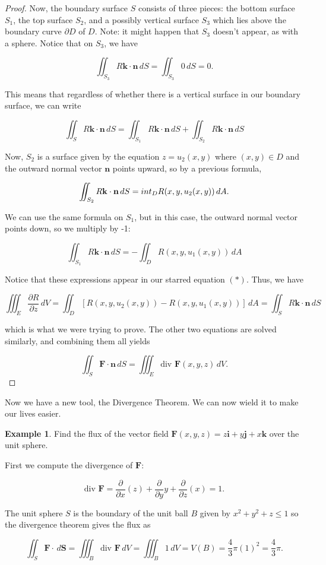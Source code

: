 \documentclass[11pt,oneside,english]{amsart}
\theoremstyle{definition}
\newtheorem*{example}{Example}
\newcommand{\pp}[2]{\frac{\partial{#1}}{\partial{#2}}}
\begin{document}
\begin{proof}
Now, the boundary surface $S$ consists of three pieces: the bottom surface $S_1$, the top surface $S_2$, and a possibly vertical surface $S_3$ which lies above the boundary curve $\partial D$ of $D$. Note: it might happen that $S_3$ doesn't appear, as with a sphere. Notice that on $S_3$, we have

\[
\iint_{S_3}R\mathbf{k}\cdot\mathbf{n}\,dS=\iint_{S_3}0\,dS=0.
\]

This means that regardless of whether there is a vertical surface in our boundary surface, we can write

\[
\iint_SR\mathbf{k}\cdot\mathbf{n}\,dS=\iint_{S_1}R\mathbf{k}\cdot\mathbf{n}\,dS+\iint_{S_2}R\mathbf{k}\cdot\mathbf{n}\,dS
\]

Now, $S_2$ is a surface given by the equation $z=u_2(x,y)$ where $(x,y)\in D$ and the outward normal vector $\mathbf{n}$ points upward, so by a previous formula,



\[
\iint_{S_2}R\mathbf{k}\cdot\mathbf{n}\,dS=\\int_DR(x,y,u_2(x,y))\,dA.
\]

We can use the same formula on $S_1$, but in this case, the outward normal vector points down, so we multiply by -1:

\[
\iint_{S_1}R\mathbf{k}\cdot\mathbf{n}\,dS=-\iint_DR(x,y,u_1(x,y))\,dA
\]

Notice that these expressions appear in our starred equation $(*)$. Thus, we have

\[
\iiint_E\pp{R}{z}\,dV=\iint_D\left[R(x,y,u_2(x,y))-R(x,y,u_1(x,y))\right]\,dA=\iint_SR\mathbf{k}\cdot\mathbf{n}\,dS
\]

which is what we were trying to prove. The other two equations are solved similarly, and combining them all yields

\[
\iint_S\mathbf{F}\cdot\mathbf{n}\,dS=\iiint_E\text{div }\mathbf{F}(x,y,z)\,dV.
\]
\end{proof}

Now we have a new tool, the Divergence Theorem. We can now wield it to make our lives easier.

\begin{example}
Find the flux of the vector field $\mathbf{F}(x,y,z)=z\mathbf{i}+y\mathbf{j}+x\mathbf{k}$ over the unit sphere.

First we compute the divergence of $\mathbf{F}$:

\[
\text{div }\mathbf{F}=\pp{}{x}(z)+\pp{}{y}{y}+\pp{}{z}(x)=1.
\]

The unit sphere $S$ is the boundary of the unit ball $B$ given by $x^2+y^2+z\leq 1$ so the divergence theorem gives the flux as

\[
\iint_S\mathbf{F}\cdot\,d\mathbf{S}=\iiint_B\text{div }\mathbf{F}\,dV=\iiint_B1\,dV=V(B)=\frac{4}{3}\pi(1)^2=\frac{4}{3}\pi.
\]
\end{example}
\end{document}
